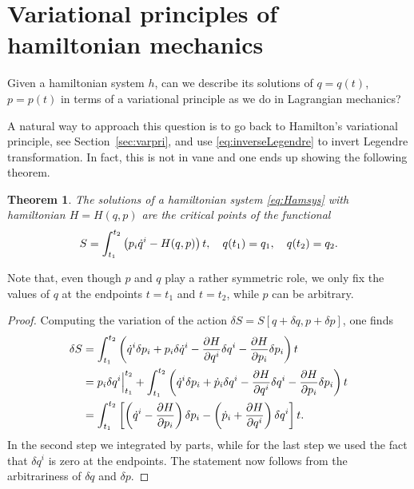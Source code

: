 \documentclass[english,fontsize=11pt,paper=a5,oneside]{scrbook}
\let\d\relax
\newcommand{\d}{\mathrm{d}}
\newtheorem{theorem}{Theorem}[chapter]
\theoremstyle{definition}
\begin{document}
\section{Variational principles of hamiltonian mechanics}

Given a hamiltonian system $h$, can we describe its solutions of $q=q(t)$, $p=p(t)$ in terms of a variational principle as we do in Lagrangian mechanics?

A natural way to approach this question is to go back to Hamilton's variational principle, see Section~\ref{sec:varpri}, and use \eqref{eq:inverseLegendre} to invert Legendre transformation.
In fact, this is not in vane and one ends up showing the following theorem.

\begin{theorem}\label{thm:variationalHamilton}
  The solutions of a hamiltonian system \eqref{eq:Hamsys} with hamiltonian $H=H(q,p)$ are the critical points of the functional
  \begin{equation}\label{eq:variationalHamilton}
    S = \int_{t_1}^{t_2} \left(p_i\dot q^i - H(q,p)\right) \d t,
    \quad q(t_1) = q_1, \quad q(t_2) = q_2.
  \end{equation}
\end{theorem}
Note that, even though $p$ and $q$ play a rather symmetric role, we only fix the values of $q$ at the endpoints $t=t_1$ and $t=t_2$, while $p$ can be arbitrary.

\begin{proof}
  Computing the variation of the action $\delta S = S[q+\delta q, p + \delta p]$, one finds
  \begin{align}
    \delta S
     & = \int_{t_1}^{t_2} \left( \dot q^i \delta p_i + p_i \delta \dot q^i - \frac{\partial H}{\partial q^i}\delta q^i - \frac{\partial H}{\partial p_i}\delta p_i \right) \d t                                   \\
     & = p_i \delta q^i\Big|_{t_1}^{t_2} + \int_{t_1}^{t_2} \left( \dot q^i \delta p_i + \dot p_i \delta q^i - \frac{\partial H}{\partial q^i}\delta q^i - \frac{\partial H}{\partial p_i}\delta p_i \right) \d t \\
     & = \int_{t_1}^{t_2} \left[
      \left(\dot q^i - \frac{\partial H}{\partial p_i} \right) \delta p_i
      - \left(\dot p_i + \frac{\partial H}{\partial q^i}\right) \delta q^i
      \right] \d t.
  \end{align}
  In the second step we integrated by parts, while for the last step we used the fact that $\delta q^i$ is zero at the endpoints.
  The statement now follows from the arbitrariness of $\delta q$ and $\delta p$.
\end{proof}
\end{document}
